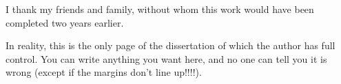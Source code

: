 \begin{acknowledgements}
I thank my friends and family, without whom this work would have been completed two years earlier.

In reality, this is the only page of the dissertation of which the author has full control.
You can write anything you want here, and no one can tell you it is wrong (except if the margins don't line up!!!!).
\end{acknowledgements}

